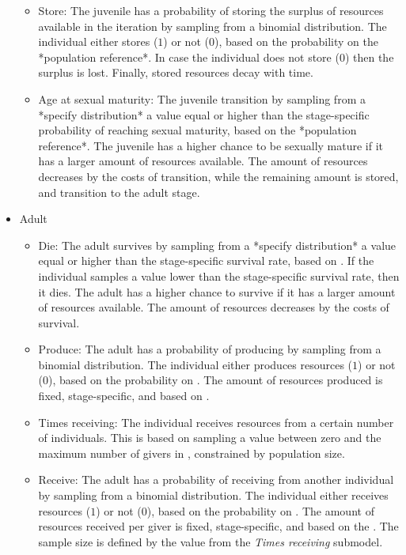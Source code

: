 \documentclass{article}
\begin{document}
\begin{itemize}
\begin{itemize}
        \item Store: The juvenile has a probability of storing the surplus of resources available in the iteration by sampling from a binomial distribution. The individual either stores ($1$) or not ($0$), based on the probability on the *population reference*. In case the individual does not store ($0$) then the surplus is lost. Finally, stored resources decay with time.
        \item Age at sexual maturity: The juvenile transition by sampling from a *specify distribution* a value equal or higher than the stage-specific probability of reaching sexual maturity, based on the *population reference*. The juvenile has a higher chance to be sexually mature if it has a larger amount of resources available. The amount of resources decreases by the costs of transition, while the remaining amount is stored, and transition to the adult stage.
    \end{itemize}
    \item Adult
    \begin{itemize}
        \item Die: The adult survives by sampling from a *specify distribution* a value equal or higher than the stage-specific survival rate, based on \cite{gurven2007longevity}. If the individual samples a value lower than the stage-specific survival rate, then it dies. The adult has a higher chance to survive if it has a larger amount of resources available. The amount of resources decreases by the costs of survival.
        \item Produce: The adult has a probability of producing by sampling from a binomial distribution. The individual either produces resources ($1$) or not ($0$), based on the probability on \cite{koster2020life}. The amount of resources produced is fixed, stage-specific, and based on \cite{koster2020life}.
        \item Times receiving: The individual receives resources from a certain number of individuals. This is based on sampling a value between zero and the maximum number of givers in \cite{gurven2004give}, constrained by population size.
        \item Receive: The adult has a probability of receiving from another individual by sampling from a binomial distribution. The individual either receives resources ($1$) or not ($0$), based on the probability on \cite{gurven2004give}. The amount of resources received per giver is fixed, stage-specific, and based on the \cite{gurven2004give}. The sample size is defined by the value from the \emph{Times receiving} submodel. 

\end{itemize}
\end{itemize}
\end{document}
